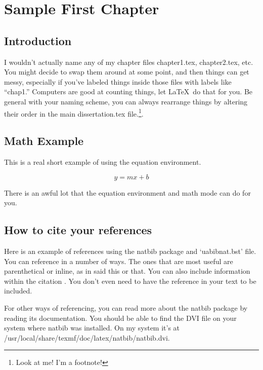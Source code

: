 \chapter{Sample First Chapter\label{chap1}}


\section{Introduction}

I wouldn't actually name any of my chapter files chapter1.tex,
chapter2.tex, etc. 
   You might decide to swap them around at some
point, and then things can get messy, especially if you've labeled
things inside those files with labels like ``chap1.''  Computers
are good at counting things, let \LaTeX\ do that for you.  Be general
with your naming scheme, you can always rearrange things by altering
their order in the main dissertation.tex file.\footnote{Look at me!  I'm a footnote!}.


\section{Math Example\label{math}}

This is a real short example of using the equation environment.

\begin{equation}
	y = mx + b
\end{equation}

There is an awful lot that the equation environment and math mode
can do for you.


\section{How to cite your references\label{ref_citation}}

Here is an example of references using the natbib package and
`uabibnat.bst' file.  You can reference in a number of ways.  The
ones that are most useful are parenthetical \citep{article,articletwo}
or inline, as in \citet{articletwo} said this or that.  You can
also include information within the citation \citep[e.g.][doesn't
have any page numbers]{2003jgr}.  You don't even need to have the
reference in your text to be included.  \nocite{2004LPI}

For other ways of referencing, you can read more about the natbib
package by reading its documentation.  You should be able to find
the DVI file on your system where natbib was installed.  On my
system it's at /usr/local/share/texmf/doc/latex/natbib/natbib.dvi.


